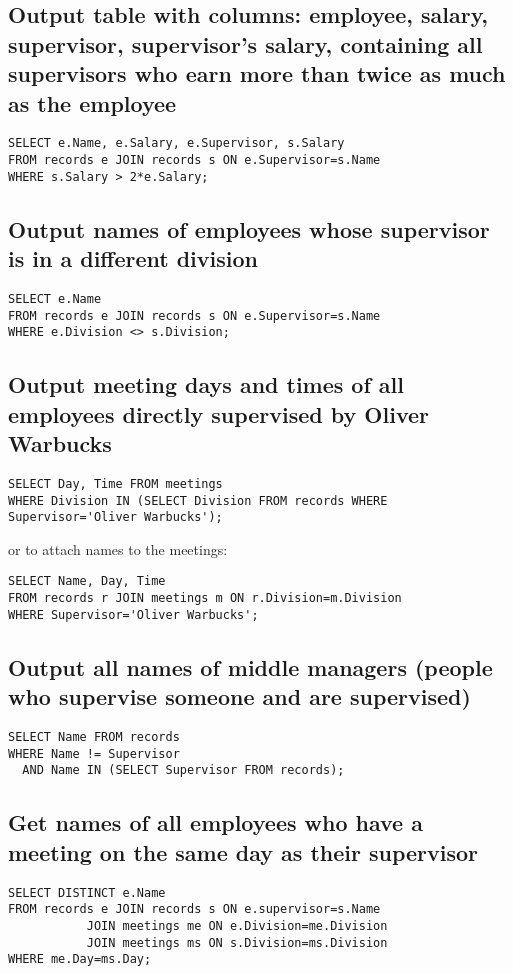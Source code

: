 \documentclass[11pt]{article}
\begin{document}
\subsection{Output table with columns: employee, salary, supervisor, supervisor's salary, containing all supervisors who earn more than twice as much as the employee}
\label{sec-1-6}
\begin{verbatim}
SELECT e.Name, e.Salary, e.Supervisor, s.Salary
FROM records e JOIN records s ON e.Supervisor=s.Name
WHERE s.Salary > 2*e.Salary;
\end{verbatim}

\subsection{Output names of employees whose supervisor is in a different division}
\label{sec-1-7}
\begin{verbatim}
SELECT e.Name
FROM records e JOIN records s ON e.Supervisor=s.Name
WHERE e.Division <> s.Division;
\end{verbatim}

\subsection{Output meeting days and times of all employees directly supervised by Oliver Warbucks}
\label{sec-1-8}
\begin{verbatim}
SELECT Day, Time FROM meetings
WHERE Division IN (SELECT Division FROM records WHERE Supervisor='Oliver Warbucks');
\end{verbatim}

or to attach names to the meetings:
\begin{verbatim}
SELECT Name, Day, Time
FROM records r JOIN meetings m ON r.Division=m.Division
WHERE Supervisor='Oliver Warbucks';
\end{verbatim}

\subsection{Output all names of middle managers (people who supervise someone and are supervised)}
\label{sec-1-9}
\begin{verbatim}
SELECT Name FROM records
WHERE Name != Supervisor
  AND Name IN (SELECT Supervisor FROM records);
\end{verbatim}

\subsection{Get names of all employees who have a meeting on the same day as their supervisor}
\label{sec-1-10}
\begin{verbatim}
SELECT DISTINCT e.Name
FROM records e JOIN records s ON e.supervisor=s.Name
	       JOIN meetings me ON e.Division=me.Division
	       JOIN meetings ms ON s.Division=ms.Division
WHERE me.Day=ms.Day;
\end{verbatim}
\end{document}
